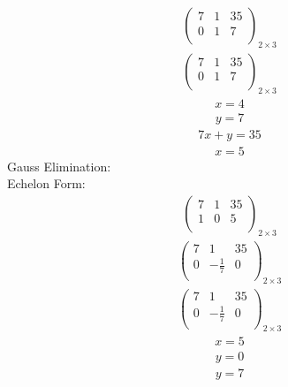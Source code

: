 \documentclass{article}
\begin{document}
\begin{align*}
\left(
\begin{array}{cc|c}
7 & 1 & 35\\
0 & 1 & 7\\
\end{array}
\right)_{2\times 3}
\end{align*}
\begin{align*}
\left(
\begin{array}{cc|c}
7 & 1 & 35\\
0 & 1 & 7\\
\end{array}
\right)_{2\times 3}
\end{align*}
\begin{align*}
x=4\end{align*}
\begin{align*}
y=7\end{align*}
\begin{align*}
7x + y=35\end{align*}
\begin{align*}
x=5\end{align*}
Gauss Elimination:\\
Echelon Form:\\
\begin{align*}
\left(
\begin{array}{cc|c}
7 & 1 & 35\\
1 & 0 & 5\\
\end{array}
\right)_{2\times 3}
\end{align*}
\begin{align*}
\left(
\begin{array}{cc|c}
7 & 1 & 35\\
0 & -\frac{1}{7} & 0\\
\end{array}
\right)_{2\times 3}
\end{align*}
\begin{align*}
\left(
\begin{array}{cc|c}
7 & 1 & 35\\
0 & -\frac{1}{7} & 0\\
\end{array}
\right)_{2\times 3}
\end{align*}
\begin{align*}
x=5\end{align*}
\begin{align*}
y=0\end{align*}
\begin{align*}
y=7\end{align*}
\end{document}
